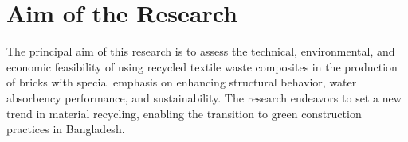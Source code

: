\section{Aim of the Research}
The principal aim of this research is to assess the technical, environmental, and economic feasibility of using recycled textile waste composites in the production of bricks with special emphasis on enhancing structural behavior, water absorbency performance, and sustainability. The research endeavors to set a new trend in material recycling, enabling the transition to green construction practices in Bangladesh. 